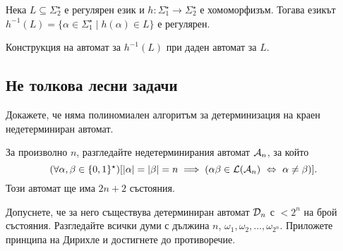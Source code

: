 \begin{problem}
  Нека $L\subseteq \Sigma^\star_2$ е регулярен език и $h:\Sigma^\star_1\to\Sigma^\star_2$ е хомоморфизъм.
  Тогава езикът
  $h^{-1}(L) = \{\alpha \in \Sigma^\star_1 \mid h(\alpha) \in L\}$ е регулярен.  
\end{problem}
\begin{hint}
  Конструкция на автомат за $h^{-1}(L)$ при даден автомат за $L$.
\end{hint}

\subsection{Не толкова лесни задачи}

\begin{problem}
  Докажете, че няма полиномиален алгоритъм за детерминизация на краен недетерминиран автомат.
\end{problem}
\begin{hint}
  За произволно $n$, разгледайте недетерминирания автомат $\mathcal{A}_n$, за който
  \[(\forall \alpha,\beta \in \{0,1\}^\star)[|\alpha| = |\beta| = n \implies (\alpha\beta \in \mathcal{L}(\mathcal{A}_n) \ \Leftrightarrow\  \alpha \neq \beta)].\]
  Този автомат ще има $2n+2$ състояния.

  Допуснете, че за него съществува детерминиран автомат $\mathcal{D}_n$ с $< 2^n$ на брой състояния.
  Разгледайте всички думи с дължина $n$, $\omega_1,\omega_2,\dots,\omega_{2^n}$.
  Приложете принципа на Дирихле и достигнете до противоречие.
\end{hint}



